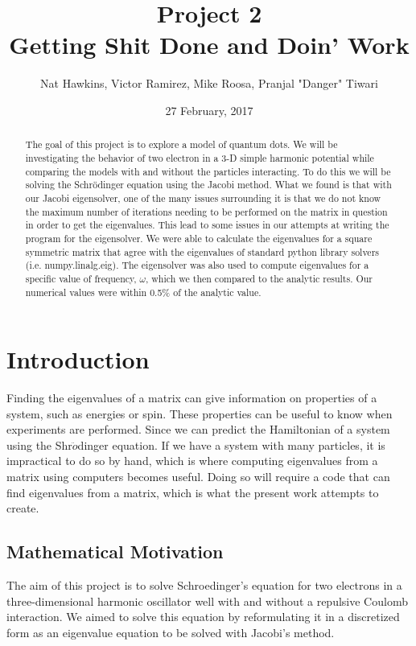 \documentclass{article}
\title{Project 2\\ Getting Shit Done and Doin' Work}
\author{Nat Hawkins, Victor Ramirez, Mike Roosa, Pranjal "Danger" Tiwari}
\date{27 February, 2017}
\begin{document}
\maketitle
\noindent
\begin{abstract}
	The goal of this project is to explore a model of quantum dots. We will be investigating the behavior of two electron in a 3-D simple harmonic potential while comparing the models with and without the particles interacting. To do this we will be solving the Schrödinger equation using the Jacobi method. What we found is that with our Jacobi eigensolver, one of the many issues surrounding it is that we do not know the maximum number of iterations needing to be performed on the matrix in question in order to get the eigenvalues. This lead to some issues in our attempts at writing the program for the eigensolver. We were able to calculate the eigenvalues for a square symmetric matrix that agree with the eigenvalues of standard python library solvers (i.e. numpy.linalg.eig). The eigensolver was also used to compute eigenvalues for a specific value of frequency, $\omega$, which we then compared to the analytic results. Our numerical values were within 0.5\% of the analytic value.
	
\end{abstract}

\section{Introduction}
Finding the eigenvalues of a matrix can give information on properties of a system, such as energies or spin. These properties can be useful to know when experiments are performed. Since we can predict the Hamiltonian of a system using the Shr$\ddot{o}$dinger equation. If we have a system with many particles, it is impractical to do so by hand, which is where computing eigenvalues from a matrix using computers becomes useful. Doing so will require a code that can find eigenvalues from a matrix, which is what the present work attempts to create.

\subsection{Mathematical Motivation}

The aim of this project is to solve Schroedinger's equation for two
electrons in a three-dimensional harmonic oscillator well with and
without a repulsive Coulomb interaction.  We aimed to solve this
equation by reformulating it in a discretized form as an eigenvalue
equation to be solved with Jacobi's method. 
\end{document}
